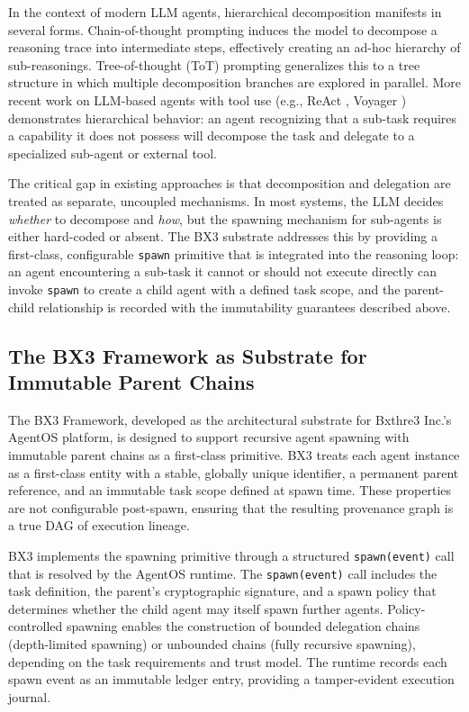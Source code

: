In the context of modern LLM agents, hierarchical decomposition manifests in several forms. Chain-of-thought prompting \cite{Wei2022ChainOfThought} induces the model to decompose a reasoning trace into intermediate steps, effectively creating an ad-hoc hierarchy of sub-reasonings. Tree-of-thought (ToT) prompting \cite{Yao2023TreeOfThought} generalizes this to a tree structure in which multiple decomposition branches are explored in parallel. More recent work on LLM-based agents with tool use (e.g., ReAct \cite{Yao2022ReAct}, Voyager \cite{Wang2023Voyager}) demonstrates hierarchical behavior: an agent recognizing that a sub-task requires a capability it does not possess will decompose the task and delegate to a specialized sub-agent or external tool.

The critical gap in existing approaches is that decomposition and delegation are treated as separate, uncoupled mechanisms. In most systems, the LLM decides \textit{whether} to decompose and \textit{how}, but the spawning mechanism for sub-agents is either hard-coded or absent. The BX3 substrate addresses this by providing a first-class, configurable \texttt{spawn} primitive that is integrated into the reasoning loop: an agent encountering a sub-task it cannot or should not execute directly can invoke \texttt{spawn} to create a child agent with a defined task scope, and the parent-child relationship is recorded with the immutability guarantees described above.

\subsection{The BX3 Framework as Substrate for Immutable Parent Chains}

The BX3 Framework, developed as the architectural substrate for Bxthre3 Inc.'s AgentOS platform, is designed to support recursive agent spawning with immutable parent chains as a first-class primitive. BX3 treats each agent instance as a first-class entity with a stable, globally unique identifier, a permanent parent reference, and an immutable task scope defined at spawn time. These properties are not configurable post-spawn, ensuring that the resulting provenance graph is a true DAG of execution lineage.

BX3 implements the spawning primitive through a structured \texttt{spawn(event)} call that is resolved by the AgentOS runtime. The \texttt{spawn(event)} call includes the task definition, the parent's cryptographic signature, and a spawn policy that determines whether the child agent may itself spawn further agents. Policy-controlled spawning enables the construction of bounded delegation chains (depth-limited spawning) or unbounded chains (fully recursive spawning), depending on the task requirements and trust model. The runtime records each spawn event as an immutable ledger entry, providing a tamper-evident execution journal.

